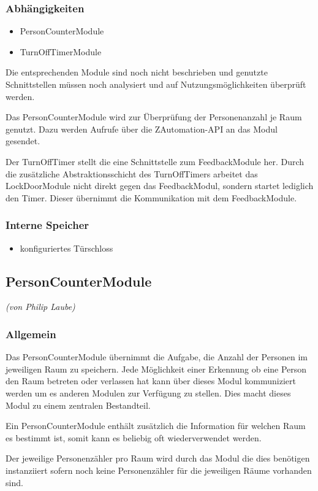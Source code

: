 \subsubsection{Abhängigkeiten}
\begin{itemize}
	\item PersonCounterModule
	\item TurnOffTimerModule
\end{itemize}
Die entsprechenden Module sind noch nicht beschrieben und genutzte Schnittstellen müssen noch analysiert und auf Nutzungsmöglichkeiten überprüft werden.

Das PersonCounterModule wird zur Überprüfung der Personenanzahl je Raum genutzt. Dazu werden Aufrufe über die ZAutomation-API an das Modul gesendet.

Der TurnOffTimer stellt die eine Schnittstelle zum FeedbackModule her. Durch die zusätzliche Abstraktionsschicht des TurnOffTimers arbeitet das LockDoorModule nicht direkt gegen das FeedbackModul, sondern startet lediglich den Timer. Dieser übernimmt die Kommunikation mit dem FeedbackModule.


\subsubsection{Interne Speicher}
\begin{itemize}
	\item konfiguriertes Türschloss
\end{itemize}

\subsection{PersonCounterModule}
\emph{(von Philip Laube)}
\subsubsection{Allgemein}
Das PersonCounterModule übernimmt die Aufgabe, die Anzahl der Personen im jeweiligen Raum zu speichern. Jede Möglichkeit einer Erkennung ob eine Person den Raum betreten oder verlassen hat kann über dieses Modul kommuniziert werden um es anderen Modulen zur Verfügung zu stellen. Dies macht dieses Modul zu einem zentralen Bestandteil.

Ein PersonCounterModule enthält zusätzlich die Information für welchen Raum es bestimmt ist, somit kann es beliebig oft wiederverwendet werden.

Der jeweilige Personenzähler pro Raum wird durch das Modul die dies benötigen instanziiert sofern noch keine Personenzähler für die jeweiligen Räume vorhanden sind.

